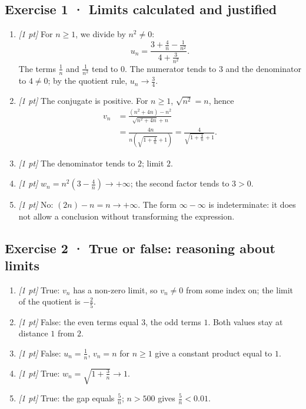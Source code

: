\subsection*{Exercise 1 · Limits calculated and justified}\begin{enumerate}

\item \textit{[1 pt]} For $n\ge1$, we divide by $n^2\ne0$:
\[u_n=\frac{3+\frac{4}{n}-\frac{1}{n^2}}{4+\frac{3}{n^2}}.\]
The terms $\frac{1}{n}$ and $\frac{1}{n^2}$ tend to $0$. The numerator tends to $3$ and the denominator to $4\ne0$; by the quotient rule, $u_n\to\frac{3}{4}$.

\item \textit{[1 pt]} The conjugate is positive. For $n\ge1$, $\sqrt{n^2}=n$, hence
\[\begin{aligned}v_n&=\frac{(n^2+4n)-n^2}{\sqrt{n^2+4n}+n}\\&=\frac{4n}{n(\sqrt{1+\frac{4}{n}}+1)}=\frac{4}{\sqrt{1+\frac{4}{n}}+1}.\end{aligned}\]

\item \textit{[1 pt]} The denominator tends to $2$; limit $2$.

\item \textit{[1 pt]} $w_n=n^2(3-\frac{4}{n})\to+\infty$; the second factor tends to $3>0$.

\item \textit{[1 pt]} No: $(2n)-n=n\to+\infty$. The form $\infty-\infty$ is indeterminate: it does not allow a conclusion without transforming the expression.

\end{enumerate}

\subsection*{Exercise 2 · True or false: reasoning about limits}\begin{enumerate}

\item \textit{[1 pt]} True: $v_n$ has a non-zero limit, so $v_n\ne0$ from some index on; the limit of the quotient is $-\frac{2}{5}$.

\item \textit{[1 pt]} False: the even terms equal $3$, the odd terms $1$. Both values stay at distance $1$ from $2$.

\item \textit{[1 pt]} False: $u_n=\frac{1}{n}$, $v_n=n$ for $n\ge1$ give a constant product equal to $1$.

\item \textit{[1 pt]} True: $w_n=\sqrt{1+\frac{3}{n}}\to1$.

\item \textit{[1 pt]} True: the gap equals $\frac{5}{n}$; $n>500$ gives $\frac{5}{n}<\num{0,01}$.

\end{enumerate}

